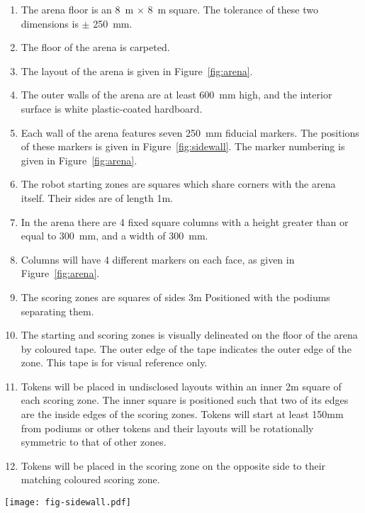 \begin{enumerate}
  \item The arena floor is an \SI{8}{m} $\times$ \SI{8}{m} square. The tolerance
        of these two dimensions is $\pm$ \SI{250}{mm}.
  \item The floor of the arena is carpeted.
  \item The layout of the arena is given in Figure~\ref{fig:arena}.
  \item The outer walls of the arena are at least \SI{600}{mm} high, and the
        interior surface is white plastic-coated hardboard.
  \item Each wall of the arena features seven \SI{250}{mm} fiducial markers.
        The positions of these markers is given in Figure~\ref{fig:sidewall}.
        The marker numbering is given in Figure~\ref{fig:arena}.
  \item The robot starting zones are squares which share corners with the arena
        itself. Their sides are of length \si{1}{m}.
  \item In the arena there are 4 fixed square columns with a height greater than
        or equal to \SI{300}{mm}, and a width of \SI{300}{mm}.
  \item Columns will have 4 different markers on each face, as given in Figure~\ref{fig:arena}.
  \item The scoring zones are squares of sides \si{3}{m} Positioned with the podiums separating them.
  \item The starting and scoring zones is visually delineated on the floor of
        the arena by coloured tape. The outer edge of the tape indicates the
        outer edge of the zone. This tape is for visual reference only.
  \item \label{spec:tokenpos} Tokens will be placed in undisclosed layouts
        within an inner \si{2}{m} square of each scoring zone. The inner square
        is positioned such that two of its edges are the inside edges of the
        scoring zones. Tokens will start at least \si{150}{mm} from podiums
        or other tokens and their layouts will be rotationally symmetric to
        that of other zones.
  \item Tokens will be placed in the scoring zone on the opposite side to their
        matching coloured scoring zone.
\end{enumerate}

\begin{sidewaysfigure}
  \texttt{[image: fig-sidewall.pdf]}
  \caption{Layout of markers along each arena wall.}
  \label{fig:sidewall}
\end{sidewaysfigure}

